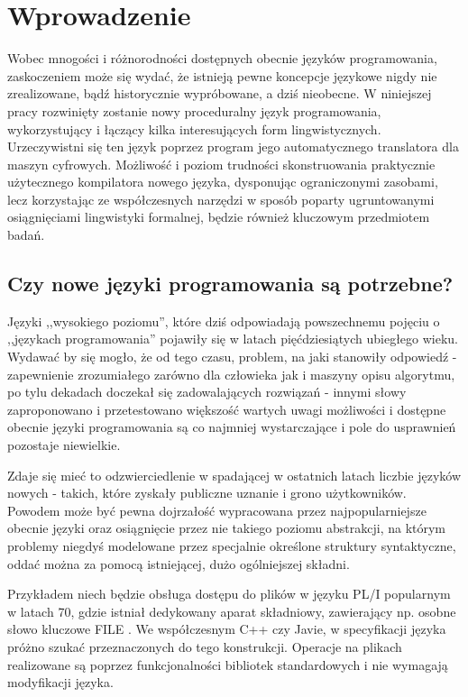 \chapter{Wprowadzenie}
\label{cha:wstep}

Wobec mnogości i różnorodności dostępnych obecnie języków programowania, zaskoczeniem może się wydać, że istnieją pewne koncepcje językowe nigdy nie zrealizowane, bądź historycznie wypróbowane, a dziś nieobecne. W niniejszej pracy rozwinięty zostanie nowy proceduralny język programowania, wykorzystujący i łączący kilka interesujących form lingwistycznych.
Urzeczywistni się ten język poprzez program jego automatycznego translatora dla maszyn cyfrowych. Możliwość i poziom trudności skonstruowania praktycznie użytecznego kompilatora nowego języka, dysponując ograniczonymi zasobami, lecz korzystając ze współczesnych narzędzi w sposób poparty ugruntowanymi osiągnięciami lingwistyki formalnej, będzie również kluczowym przedmiotem badań.


\section{Czy nowe języki programowania są potrzebne?}
\label{czy_potrzebne}
Języki ,,wysokiego poziomu'', które dziś odpowiadają powszechnemu pojęciu o ,,językach programowania'' pojawiły się w latach pięćdziesiątych ubiegłego wieku.\cite[s.~13]{DRAGON_BOOK} Wydawać by się mogło, że od tego czasu, problem, na jaki stanowiły odpowiedź - zapewnienie zrozumiałego zarówno dla człowieka jak i maszyny opisu algorytmu, po tylu dekadach doczekał się zadowalających rozwiązań - innymi słowy zaproponowano i przetestowano większość wartych uwagi możliwości i dostępne obecnie języki programowania są co najmniej wystarczające i pole do usprawnień pozostaje niewielkie.

Zdaje się mieć to odzwierciedlenie w spadającej w ostatnich latach liczbie języków nowych - takich, które zyskały publiczne uznanie i grono użytkowników.\cite{valverde2015} Powodem może być pewna dojrzałość wypracowana przez najpopularniejsze obecnie języki oraz osiągnięcie przez nie takiego poziomu abstrakcji, na którym problemy niegdyś modelowane przez specjalnie określone struktury syntaktyczne, oddać można za pomocą istniejącej, dużo ogólniejszej składni.

Przykładem niech będzie obsługa dostępu do plików w języku PL/I popularnym w latach 70, gdzie istniał dedykowany aparat składniowy, zawierający np. osobne słowo kluczowe FILE \cite[s.~96]{plif}. We współczesnym C++ czy Javie, w specyfikacji języka próżno szukać przeznaczonych do tego konstrukcji. Operacje na plikach realizowane są poprzez funkcjonalności bibliotek standardowych i nie wymagają modyfikacji języka.


